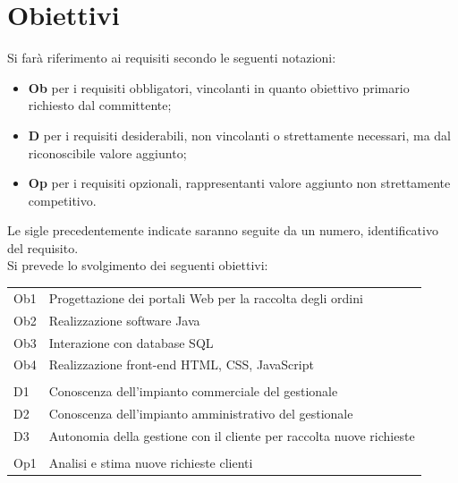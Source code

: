 \documentclass[a4paper]{article}
\begin{document}
\clearpage
\section*{Obiettivi}
Si farà riferimento ai requisiti secondo le seguenti notazioni:
\begin{itemize}
	\item \textbf{Ob} per i requisiti obbligatori, vincolanti in quanto obiettivo primario richiesto dal committente;
	\item  \textbf{D} per i requisiti desiderabili, non vincolanti o strettamente necessari, ma dal riconoscibile valore aggiunto;
	\item \textbf{Op} per i requisiti opzionali, rappresentanti valore aggiunto non strettamente competitivo.
\end{itemize}
Le sigle precedentemente indicate saranno seguite da un numero, identificativo del requisito.\\


Si prevede lo svolgimento dei seguenti obiettivi:

\begin{table}[h]
	\centering
	\begin{tabular}{|>{\centering} m{2cm}|m{11cm}|}
	\hline
	\multicolumn{2}{|c|}{\textbf{Obbligatori}}\\
	\hline
	Ob1 & Progettazione dei portali Web per la raccolta degli ordini \\
	\hline
	Ob2 & Realizzazione software Java \\
	\hline
	Ob3 & Interazione con database SQL \\
	\hline
	Ob4 & Realizzazione front-end HTML, CSS, JavaScript \\
	\hline
	\multicolumn{2}{|c|}{\textbf{Desiderabili}}\\
	\hline
	D1 & Conoscenza dell'impianto commerciale del gestionale \\
	\hline
	D2 & Conoscenza dell'impianto amministrativo del gestionale \\
	\hline
	D3 & Autonomia della gestione con il cliente per raccolta nuove richieste \\
	\hline
	\multicolumn{2}{|c|}{\textbf{Opzionali}} \\
	\hline
	Op1 & Analisi e stima nuove richieste clienti \\
	\hline
\end{tabular}

\end{table}
\end{document}
